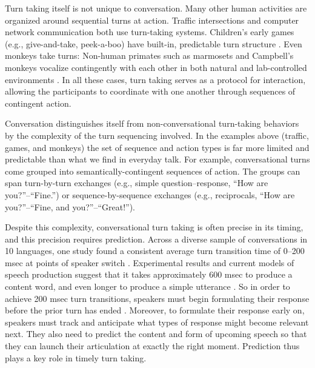 \documentclass[authoryear, 12pt]{elsarticle}
\begin{document}
Turn taking itself is not unique to conversation. Many other human activities are organized around sequential turns at action. Traffic intersections and computer network communication both use turn-taking systems. Children's early games (e.g., give-and-take, peek-a-boo) have built-in, predictable turn structure \citep{ratner1978, ross1987}. Even monkeys take turns: Non-human primates such as marmosets and Campbell's monkeys vocalize contingently with each other in both natural and lab-controlled environments \citep{lemasson2011, takahashi2013}. In all these cases, turn taking serves as a protocol for interaction, allowing the participants to coordinate with one another through sequences of contingent action. 

Conversation distinguishes itself from non-conversational turn-taking behaviors by the complexity of the turn sequencing involved. In the examples above (traffic, games, and monkeys) the set of sequence and action types is far more limited and predictable than what we find in everyday talk. For example, conversational turns come grouped into semantically-contingent sequences of action. The groups can span turn-by-turn exchanges (e.g., simple question--response, ``How are you?''--``Fine.'') or sequence-by-sequence exchanges (e.g., reciprocals, ``How are you?''--``Fine, and you?''--``Great!''). 


Despite this complexity, conversational turn taking is often precise in its timing, and this precision requires prediction. Across a diverse sample of conversations in 10 languages, one study found a consistent average turn transition time of 0--200 msec at points of speaker switch \citep{stivers2009}. Experimental results and current models of speech production suggest that it takes approximately 600 msec to produce a content word, and even longer to produce a simple utterance \citep{griffin2000, levelt1989}. So in order to achieve 200 msec turn transitions, speakers must begin formulating their response before the prior turn has ended \citep{levinson2013}. Moreover, to formulate their response early on, speakers must track and anticipate what types of response might become relevant next. They also need to predict the content and form of upcoming speech so that they can launch their articulation at exactly the right moment. Prediction thus plays a key role in timely turn taking.
\end{document}
